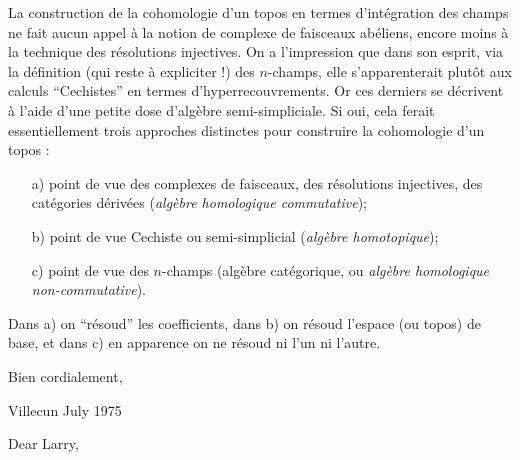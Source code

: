 \label{sec:app8}%
La construction de la cohomologie d'un topos en termes d'intégration des champs ne fait aucun appel à la notion de complexe de faisceaux abéliens, encore moins à la technique des résolutions injectives. On a l'impression que dans son esprit, via la définition (qui reste à expliciter !) des $n$-champs, elle s'apparenterait plutôt aux calculs ``Cechistes'' en termes d'hyperrecouvrements. Or ces derniers se décrivent à l'aide d'une petite dose d'algèbre semi-simpliciale. Si oui, cela ferait essentiellement trois approches distinctes pour construire la cohomologie d'un topos : 
\begin{enumerate}
\item[a)] point de vue des complexes de faisceaux, des résolutions injectives, des catégories dérivées (\emph{algèbre homologique commutative});
\item[b)] point de vue Cechiste ou semi-simplicial (\emph{algèbre homotopique});
\item[c)] point de vue des $n$-champs (algèbre catégorique, ou \emph{algèbre homologique non-commutative}).
\end{enumerate}
Dans a) on ``résoud'' les coefficients, dans b) on résoud l'espace (ou topos) de base, et dans c) en apparence on ne résoud ni l'un ni l'autre. 

Bien cordialement,

\bigskip

\par\hfill Villecun  July 1975\par

Dear Larry,

